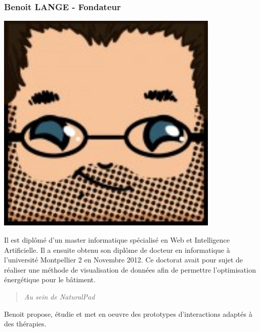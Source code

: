 		\subsubsection*{Benoit LANGE - Fondateur}
\begin{minipage}[t!]{0.2\linewidth}
\centering
\includegraphics[width=0.8\textwidth]{images/tetocarre/ben}
\end{minipage}
\begin{minipage}[t!]{0.79\linewidth}
Il est diplômé d’un master informatique spécialisé en Web et Intelligence Artificielle. Il a ensuite obtenu son diplôme de docteur en informatique à l’université Montpellier 2 en Novembre 2012. Ce doctorat avait pour sujet de réaliser une méthode de visualisation de données afin de permettre l’optimisation énergétique pour le bâtiment. 
		\begin{quotation} \emph{Au sein de NaturalPad} \end{quotation}
Benoit propose, étudie et met en oeuvre des prototypes d’interactions adaptés à des thérapies.
\end{minipage}

